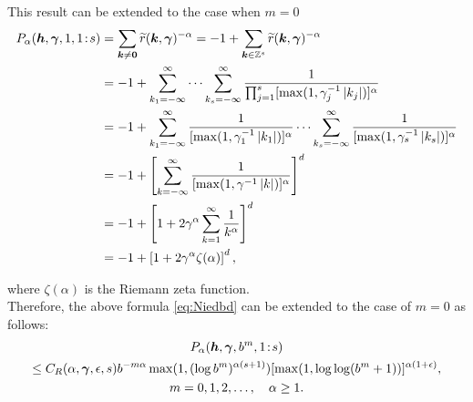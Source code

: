 \documentclass[authoryear]{elsarticle}
\newcommand{\tr}{\widetilde{r}}
\newcommand{\appxintn}{\appxint_n}
\DeclareMathOperator{\appxint}{\hat{I}}
\newcommand{\onetos}{1\!:\!s}
\begin{document}
This result can be extended to the case when $m = 0$
\begin{align*}
    P_{\alpha}(\vh,\vgamma,1,\onetos) & = \sum_{\vk \ne \vzero} \tr(\vk, \vgamma)^{-\alpha} = -1 + \sum_{\vk \in \integers^s} \tr(\vk,\vgamma)^{-\alpha} \\
    & = -1 + \sum_{k_1 =-\infty}^{\infty} \cdots \sum_{k_s  =-\infty}^{\infty} \frac{1}{\prod_{j=1}^s[\max(1,\gamma_j^{-1}\abs{k_j})]^\alpha} \\
    & = -1 + \sum_{k_1 =-\infty}^{\infty} \frac{1}{[\max(1,\gamma_1^{-1}\abs{k_1})]^\alpha} \cdots \sum_{k_s  =-\infty}^{\infty} \frac{1}{[\max(1,\gamma_s^{-1}\abs{k_s})]^\alpha} \\
    & = -1 + \left[\sum_{k =-\infty}^{\infty} \frac{1}{[\max(1,\gamma^{-1}\abs{k})]^\alpha} \right]^d \\
    & = -1 + \left[1 + 2 \gamma^{\alpha} \sum_{k =1}^{\infty} \frac{1}{k^\alpha} \right]^d \\
    & = -1 + \left[1 + 2 \gamma^{\alpha}\zeta(\alpha) \right]^d,
\end{align*}

where $\zeta(\alpha)$ is the Riemann zeta function. \\

Therefore, the above formula \eqref{eq:Niedbd} can be extended to the case of $m=0$ as follows:
\begin{multline} \label{eq:Palphaextm}
    P_{\alpha}(\vh,\vgamma,b^m,\onetos) \\
    \le C_{R}(\alpha,\vgamma,\epsilon,s)
    b^{-m\alpha}\max(1, (\log b^{m})^{\alpha(s+1)})[\max(1,\log \log (
    b^m+1))]^{\alpha(1+\epsilon)}, \\ m =0, 1, 2,\ldots, \quad \alpha \ge 1.
\end{multline}


\end{document}
